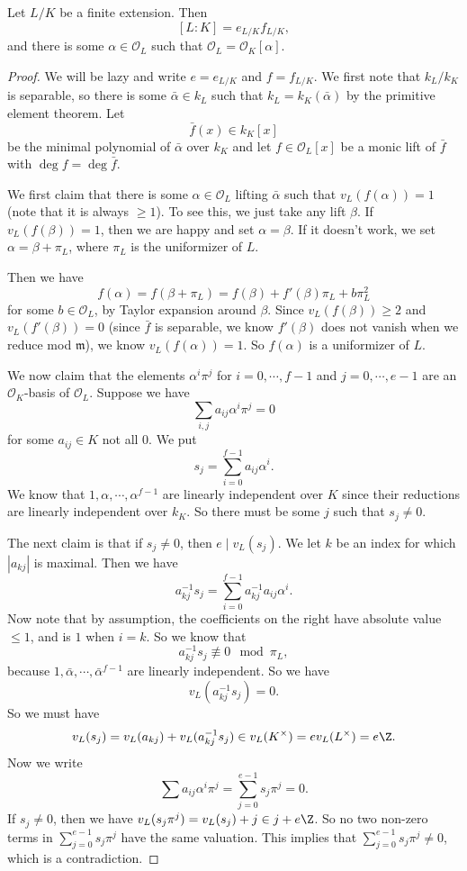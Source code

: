 \documentclass[a4paper]{article}
\begin{document}
\begin{thm}
  Let $L/K$ be a finite extension. Then
  \[
    [L:K] = e_{L/K}f_{L/K},
  \]
  and there is some $\alpha \in \mathcal{O}_L$ such that $\mathcal{O}_L = \mathcal{O}_K[\alpha]$.
\end{thm}

\begin{proof}
  We will be lazy and write $e = e_{L/K}$ and $f = f_{L/K}$. We first note that $k_L/k_K$ is separable, so there is some $\bar{\alpha} \in k_L$ such that $k_L = k_K(\bar{\alpha})$ by the primitive element theorem. Let
  \[
    \bar{f}(x) \in k_K[x]
  \]
  be the minimal polynomial of $\bar{\alpha}$ over $k_K$ and let $f \in \mathcal{O}_L[x]$ be a monic lift of $\bar{f}$ with $\deg f = \deg \bar{f}$.

  We first claim that there is some $\alpha \in \mathcal{O}_L$ lifting $\bar{\alpha}$ such that $v_L(f(\alpha)) = 1$ (note that it is always $\geq 1$). To see this, we just take any lift $\beta$. If $v_L(f(\beta)) = 1$, then we are happy and set $\alpha = \beta$. If it doesn't work, we set $\alpha = \beta + \pi_L$, where $\pi_L$ is the uniformizer of $L$.

  Then we have
  \[
    f(\alpha) = f(\beta + \pi_L) = f(\beta) + f'(\beta) \pi_L + b \pi_L^2
  \]
  for some $b \in \mathcal{O}_L$, by Taylor expansion around $\beta$. Since $v_L(f(\beta)) \geq 2$ and $v_L(f'(\beta)) = 0$ (since $\bar{f}$ is separable, we know $f'(\beta)$ does not vanish when we reduce mod $\mathfrak{m}$), we know $v_L(f(\alpha)) = 1$. So $f(\alpha)$ is a uniformizer of $L$.

  We now claim that the elements $\alpha^i \pi^j$ for $i = 0, \cdots, f - 1$ and $j = 0, \cdots, e - 1$ are an $\mathcal{O}_K$-basis of $\mathcal{O}_L$. Suppose we have
  \[
    \sum_{i, j} a_{ij} \alpha^i \pi^j = 0
  \]
  for some $a_{ij} \in K$ not all $0$. We put
  \[
    s_j = \sum_{i = 0}^{f - 1} a_{ij}\alpha^i.
  \]
  We know that $1, \alpha, \cdots, \alpha^{f - 1}$ are linearly independent over $K$ since their reductions are linearly independent over $k_K$. So there must be some $j$ such that $s_j \not= 0$.

  The next claim is that if $s_j \not= 0$, then $e \mid v_L(s_j)$. We let $k$ be an index for which $|a_{kj}|$ is maximal. Then we have
  \[
    a_{kj}^{-1}s_j = \sum_{i = 0}^{f - 1} a_{kj}^{-1} a_{ij} \alpha^i.
  \]
  Now note that by assumption, the coefficients on the right have absolute value $\leq 1$, and is $1$ when $i = k$. So we know that
  \[
    a_{kj}^{-1} s_j \not\equiv 0 \mod \pi_L,
  \]
  because $1, \bar{\alpha}, \cdots, \bar{\alpha}^{f - 1}$ are linearly independent. So we have
  \[
    v_L(a_{kj}^{-1} s_j) = 0.
  \]
  So we must have
  \[
    v_L(s_j) = v_L(a_{kj}) + v_L(a_{kj}^{-1} s_j) \in v_L(K^\times) = e v_L(L^\times) = e\Z.
  \]
  Now we write
  \[
    \sum a_{ij} \alpha^i \pi^j = \sum_{j = 0}^{e - 1} s_j \pi^j = 0.
  \]
  If $s_j \not= 0$, then we have $v_L(s_j \pi^j) = v_L(s_j) + j \in j + e\Z$. So no two non-zero terms in $\sum_{j = 0}^{e - 1} s_j \pi^j$ have the same valuation. This implies that $\sum_{j = 0}^{e - 1} s_j \pi^j \not= 0$, which is a contradiction.


\end{proof}
\end{document}
